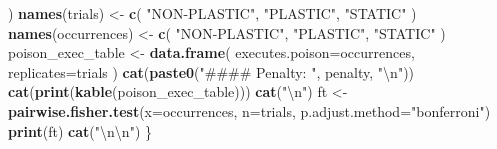 \documentclass[]{book}
\newenvironment{Shaded}{\begin{snugshade}}{\end{snugshade}}
\newcommand{\CharTok}[1]{\textcolor[rgb]{0.31,0.60,0.02}{#1}}
\newcommand{\DataTypeTok}[1]{\textcolor[rgb]{0.13,0.29,0.53}{#1}}
\newcommand{\KeywordTok}[1]{\textcolor[rgb]{0.13,0.29,0.53}{\textbf{#1}}}
\newcommand{\NormalTok}[1]{#1}
\newcommand{\StringTok}[1]{\textcolor[rgb]{0.31,0.60,0.02}{#1}}
\begin{document}
\begin{Shaded}
\begin{Highlighting}[]
\NormalTok{  )}
  \KeywordTok{names}\NormalTok{(trials) <-}\StringTok{ }\KeywordTok{c}\NormalTok{(}
    \StringTok{"NON-PLASTIC"}\NormalTok{,}
    \StringTok{"PLASTIC"}\NormalTok{,}
    \StringTok{"STATIC"}
\NormalTok{  )}
  \KeywordTok{names}\NormalTok{(occurrences) <-}\StringTok{ }\KeywordTok{c}\NormalTok{(}
    \StringTok{"NON-PLASTIC"}\NormalTok{,}
    \StringTok{"PLASTIC"}\NormalTok{,}
    \StringTok{"STATIC"}
\NormalTok{  )}
\NormalTok{  poison_exec_table <-}\StringTok{ }\KeywordTok{data.frame}\NormalTok{(}
    \DataTypeTok{executes.poison=}\NormalTok{occurrences,}
    \DataTypeTok{replicates=}\NormalTok{trials}
\NormalTok{  )}
  \KeywordTok{cat}\NormalTok{(}\KeywordTok{paste0}\NormalTok{(}\StringTok{"#### Penalty: "}\NormalTok{, penalty, }\StringTok{"}\CharTok{\textbackslash{}n}\StringTok{"}\NormalTok{))}
  \KeywordTok{cat}\NormalTok{(}\KeywordTok{print}\NormalTok{(}\KeywordTok{kable}\NormalTok{(poison_exec_table)))}
  \KeywordTok{cat}\NormalTok{(}\StringTok{"}\CharTok{\textbackslash{}n}\StringTok{"}\NormalTok{)}
\NormalTok{  ft <-}\StringTok{ }\KeywordTok{pairwise.fisher.test}\NormalTok{(}\DataTypeTok{x=}\NormalTok{occurrences, }\DataTypeTok{n=}\NormalTok{trials, }\DataTypeTok{p.adjust.method=}\StringTok{"bonferroni"}\NormalTok{)}
  \KeywordTok{print}\NormalTok{(ft)}
  \KeywordTok{cat}\NormalTok{(}\StringTok{"}\CharTok{\textbackslash{}n\textbackslash{}n}\StringTok{"}\NormalTok{)}
\NormalTok{\}}
\end{Highlighting}
\end{Shaded}
\end{document}
